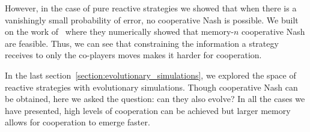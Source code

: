 \documentclass{article}
\theoremstyle{definition}
\begin{document}
However, in the case of pure reactive strategies we showed that when there is a
vanishingly small probability of error, no cooperative Nash is possible. We
built on the work of~\citep{hilbe:PNAS:2017} where they numerically showed that
memory-\(n\) cooperative Nash are feasible. Thus, we can see that constraining
the information a strategy receives to only the co-players moves makes it harder
for cooperation.

In the last section~\ref{section:evolutionary_simulations}, we explored the
space of reactive strategies with evolutionary simulations. Though cooperative
Nash can be obtained, here we asked the question: can they also evolve? In all
the cases we have presented, high levels of cooperation can be achieved but
larger memory allows for cooperation to emerge faster.

\appendix


\end{document}
